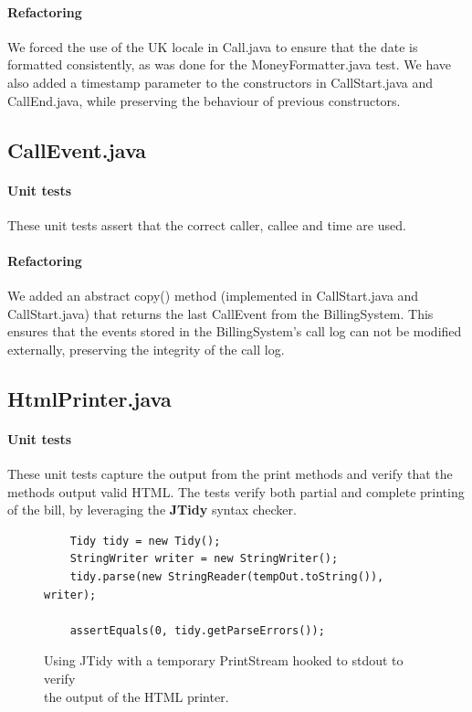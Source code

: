 \documentclass[a4paper]{article}
\begin{document}
\paragraph{Refactoring} We forced the use of the UK locale in Call.java to ensure that the date is formatted consistently, as was done for the MoneyFormatter.java test. We have also added a timestamp parameter to the constructors in CallStart.java and CallEnd.java, while preserving the behaviour of previous constructors.

\subsection{CallEvent.java}
\paragraph{Unit tests} These unit tests assert that the correct caller, callee and time are used.
\paragraph{Refactoring} We added an abstract copy() method (implemented in CallStart.java and CallStart.java) that returns the last CallEvent from the BillingSystem. This ensures that the events stored in the BillingSystem’s call log can not be modified externally, preserving the integrity of the call log.

\subsection{HtmlPrinter.java}
\paragraph{Unit tests} These unit tests capture the output from the print methods and verify that the methods output valid HTML. The tests verify both partial and complete printing of the bill, by leveraging the {\bf JTidy} syntax checker.

\begin{figure}[H]
\begin{verbatim}
    Tidy tidy = new Tidy();
    StringWriter writer = new StringWriter();
    tidy.parse(new StringReader(tempOut.toString()), writer);

    assertEquals(0, tidy.getParseErrors());
\end{verbatim}
\captionsetup{justification=centering}
\caption{Using JTidy with a temporary PrintStream hooked to stdout to verify\\the output of the HTML printer.}
\end{figure}
\end{document}
